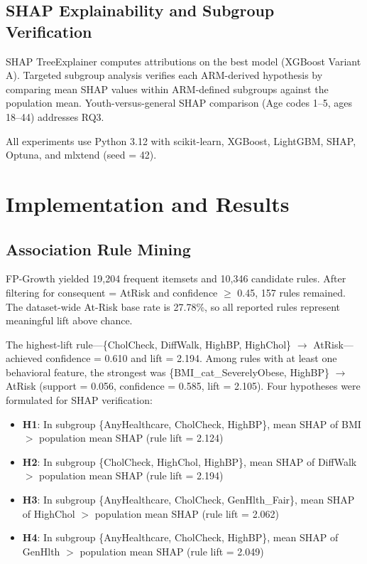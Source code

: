 ﻿\documentclass[12pt,a4paper]{article}
\begin{document}
\subsection{SHAP Explainability and Subgroup Verification}

SHAP TreeExplainer computes attributions on the best model (XGBoost Variant A).
Targeted subgroup analysis verifies each ARM-derived hypothesis by comparing mean SHAP
values within ARM-defined subgroups against the population mean. Youth-versus-general
SHAP comparison (Age codes 1--5, ages 18--44) addresses RQ3.

All experiments use Python 3.12 with scikit-learn, XGBoost, LightGBM, SHAP, Optuna,
and mlxtend (seed = 42).

\section{Implementation and Results}

\subsection{Association Rule Mining}

FP-Growth yielded 19,204 frequent itemsets and 10,346 candidate rules. After filtering
for consequent = AtRisk and confidence $\geq$ 0.45, 157 rules remained. The dataset-wide
At-Risk base rate is 27.78\%, so all reported rules represent meaningful lift above chance.

The highest-lift rule---\{CholCheck, DiffWalk, HighBP, HighChol\} $\rightarrow$ AtRisk---achieved
confidence = 0.610 and lift = 2.194. Among rules with at least one behavioral feature,
the strongest was \{BMI\_cat\_SeverelyObese, HighBP\} $\rightarrow$ AtRisk (support = 0.056,
confidence = 0.585, lift = 2.105). Four hypotheses were formulated for SHAP verification:

\begin{itemize}
    \item \textbf{H1}: In subgroup \{AnyHealthcare, CholCheck, HighBP\}, mean SHAP of BMI
    $>$ population mean SHAP (rule lift = 2.124)
    \item \textbf{H2}: In subgroup \{CholCheck, HighChol, HighBP\}, mean SHAP of DiffWalk
    $>$ population mean SHAP (rule lift = 2.194)
    \item \textbf{H3}: In subgroup \{AnyHealthcare, CholCheck, GenHlth\_Fair\}, mean SHAP
    of HighChol $>$ population mean SHAP (rule lift = 2.062)
    \item \textbf{H4}: In subgroup \{AnyHealthcare, CholCheck, HighBP\}, mean SHAP of
    GenHlth $>$ population mean SHAP (rule lift = 2.049)
\end{itemize}
\end{document}
